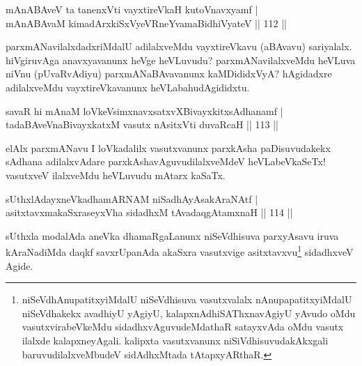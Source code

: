 \begin{shl}
mAnABAveV ta tanenxVti vayxtireVkaH kutoV\s navxyamf |\\
mAnABAvaM kimadArxkiSxVyeVRneYvamaBidhiVyateV \hfill || 112 ||
\end{shl}

\begin{artha}
parxmANavilalxdadxriMdalU adilalxveMdu vayxtireVkavu (aBAvavu) sariyalalx. hiVgiruvAga anavxyavanunx heVge heVLuvudu? parxmANavilalxveMdu heVLuva niVnu (pUvaRvAdiyu) parxmANaBAvavanunx kaMDididxVyA? hAgidadxre adilalxveMdu vayxtireVkavanunx heVLabahudAgididxtu.
\end{artha}

\begin{shl}
savaR hi mAnaM loVkeV\s simxnavxsatxvXBivayxkitxsAdhanamf |\\
tadaBAveV\s naBivayxkatxM vasutx nAsitxVti duvaRcaH \hfill || 113 ||
\end{shl}

\begin{artha}
elAlx parxmANavu I loVkadalilx vasutxvanunx parxkAsha paDisuvudakekx sAdhana adilalxvAdare parxkAshavAguvudilalxveMdeV heVLabeVkaSeTx! vasutxveV ilalxveMdu heVLuvudu mAtarx kaSaTx.
\end{artha}


\begin{shl}
sUthxlAdayxneVkadhamARNAM niSadhAyAsakAraNAtf |\\
asitxtavxmakaSxraseyxVha sidadhxM tAvadaqgAtamxnaH \hfill || 114 ||
\end{shl}

\begin{artha}
sUthxla modalAda aneVka dhamaRgaLanunx niSeVdhisuva parxyAsavu iruva kAraNadiMda daqkf savxrUpanAda akaSxra vasutxvige asitxtavxvu\footnote[3]{niSeVdhAnupatitxyiMdalU niSeVdhisuva vasutxvalalx nAnupapatitxyiMdalU niSeVdhakekx avadhiyU yAgiyU, kalapxnAdhiSAThxnavAgiyU yAvudo oMdu vasutxvirabeVkeMdu sidadhxvAguvudeMdathaR satayxvAda oMdu vasutx ilalxde kalapxneyAgali. kalipxta vasutxvanunx niSiVdhisuvudakAkxgali baruvudilalxveMbudeV sidAdhxMtada tAtapxyARthaR.} sidadhxveV Agide.
\end{artha}


